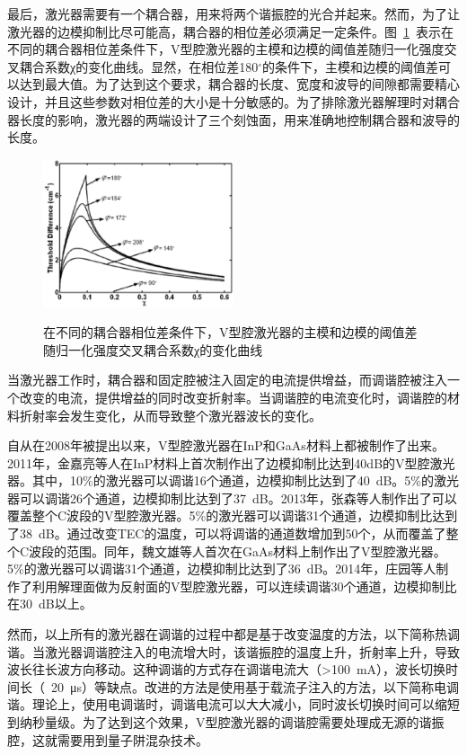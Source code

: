 \documentclass{ZJUthesis}
\begin{document}
最后，激光器需要有一个耦合器，用来将两个谐振腔的光合并起来。然而，为了让激光器的边模抑制比尽可能高，耦合器的相位差必须满足一定条件。图~\ref{fig_vccl_thd}~表示在不同的耦合器相位差条件下，V型腔激光器的主模和边模的阈值差随归一化强度交叉耦合系数χ的变化曲线。显然，在相位差180$^{\circ}$的条件下，主模和边模的阈值差可以达到最大值。为了达到这个要求，耦合器的长度、宽度和波导的间隙都需要精心设计，并且这些参数对相位差的大小是十分敏感的。为了排除激光器解理时对耦合器长度的影响，激光器的两端设计了三个刻蚀面，用来准确地控制耦合器和波导的长度。

\begin{figure}[htbp]
  \centering
  \includegraphics[width=0.5\textwidth]{./Pictures/vccl_thd.eps}\\
  \caption{在不同的耦合器相位差条件下，V型腔激光器的主模和边模的阈值差随归一化强度交叉耦合系数χ的变化曲线}
  \label{fig_vccl_thd}
\end{figure}

当激光器工作时，耦合器和固定腔被注入固定的电流提供增益，而调谐腔被注入一个改变的电流，提供增益的同时改变折射率。当调谐腔的电流变化时，调谐腔的材料折射率会发生变化，从而导致整个激光器波长的变化。

自从在2008年被提出以来\cite{He2008Wavelength}，V型腔激光器在InP和GaAs材料上都被制作了出来。2011年，金嘉亮等人在InP材料上首次制作出了边模抑制比达到40dB的V型腔激光器\cite{Jin2011Widely}。其中，10\%的激光器可以调谐16个通道，边模抑制比达到了40~dB。5\%的激光器可以调谐26个通道，边模抑制比达到了37~dB。2013年，张森等人制作出了可以覆盖整个C波段的V型腔激光器\cite{Zhang2013Simple}。5\%的激光器可以调谐31个通道，边模抑制比达到了38~dB。通过改变TEC的温度，可以将调谐的通道数增加到50个，从而覆盖了整个C波段的范围。同年，魏文雄等人首次在GaAs材料上制作出了V型腔激光器\cite{Wei2013GaAs}。5\%的激光器可以调谐31个通道，边模抑制比达到了36~dB。2014年，庄园等人制作了利用解理面做为反射面的V型腔激光器，可以连续调谐30个通道，边模抑制比在30~dB以上\cite{Yuan201430}。

然而，以上所有的激光器在调谐的过程中都是基于改变温度的方法，以下简称热调谐。当激光器调谐腔注入的电流增大时，该谐振腔的温度上升，折射率上升，导致波长往长波方向移动。这种调谐的方式存在调谐电流大（>100~mA），波长切换时间长（~20~μs）等缺点。改进的方法是使用基于载流子注入的方法，以下简称电调谐\cite{Shim1995Refractive}。理论上，使用电调谐时，调谐电流可以大大减小，同时波长切换时间可以缩短到纳秒量级\cite{Guo2012Experimental}。为了达到这个效果，V型腔激光器的调谐腔需要处理成无源的谐振腔，这就需要用到量子阱混杂技术。
\end{document}
